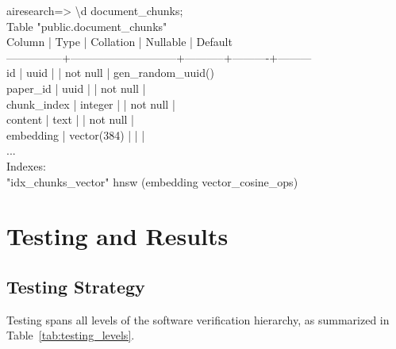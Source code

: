 \documentclass[11pt,a4paper,titlepage]{report}
\begin{document}
\begin{tcolorbox}[colback=white, colframe=primaryTeal, width=\textwidth, arc=3pt, title={PostgreSQL psql CLI Output: Native Vector Column Verification}]
\footnotesize\ttfamily
airesearch=> \textbackslash d document\_chunks;\\
                               Table "public.document\_chunks"\\
    Column     |            Type             | Collation | Nullable | Default\\
---------------+-----------------------------+-----------+----------+---------\\
 id            | uuid                        |           | not null | gen\_random\_uuid()\\
 paper\_id      | uuid                        |           | not null |\\
 chunk\_index   | integer                     |           | not null |\\
 content       | text                        |           | not null |\\
 embedding     | vector(384)                 |           |          |\\
 ...\\
Indexes:\\
    "idx\_chunks\_vector" hnsw (embedding vector\_cosine\_ops)
\end{tcolorbox}
\vspace{-2pt}
\label{fig:psql_vector}
\vspace{6pt}
\chapter{Testing and Results}

\section{Testing Strategy}
Testing spans all levels of the software verification hierarchy, as summarized in Table~\ref{tab:testing_levels}.
\end{document}
